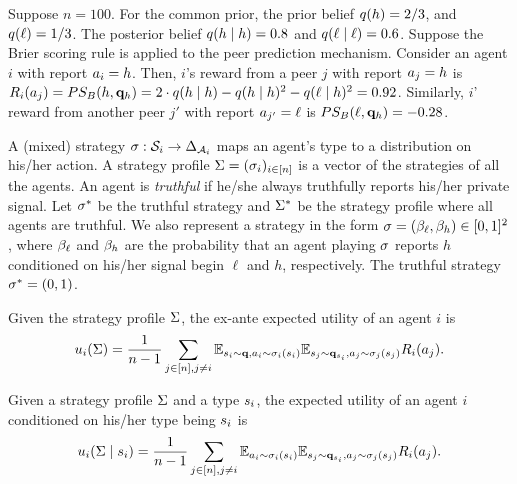 \begin{example}
    \label{ex:setting}
    Suppose $n = 100$. For the common prior, the prior belief $q(h) = 2/3$, and $q(\ell) = 1/3$. The posterior belief $q(h \mid h) = 0.8$ and $q(\ell \mid \ell) = 0.6$. Suppose the Brier scoring rule is applied to the peer prediction mechanism. Consider an agent $i$ with report $a_i = h$. Then, $i$'s reward from a peer $j$ with report $a_j = h$ is $R_i(a_j) = PS_B(h, \mathbf{q}_h) = 2\cdot q(h \mid h) - q(h\mid h)^2 - q(\ell \mid h)^2 = 0.92$. Similarly, $i$' reward from another peer $j'$ with report $a_{j'} = \ell$ is $PS_B(\ell, \mathbf{q}_h) = -0.28$. 
\end{example}

A (mixed) strategy $\sigma: \mathcal{S}_i \to \Delta_{\mathcal{A}_i}$ maps an agent's type to a distribution on his/her action. A strategy profile $\Sigma = (\sigma_i)_{i \in [n]}$ is a vector of the strategies of all the agents. An agent is {\em truthful} if he/she always truthfully reports his/her private signal. Let $\sigma^*$ be the truthful strategy and $\Sigma^*$ be the strategy profile where all agents are truthful. 
We also represent a strategy in the form $\sigma = (\beta_{\ell}, \beta_{h}) \in [0, 1]^2$, where $\beta_{\ell}$ and $\beta_{h}$ are the probability that an agent playing $\sigma$ reports $h$ conditioned on his/her signal begin $\ell$  and $h$, respectively. The truthful strategy $\sigma^* = (0, 1)$.

Given the strategy profile $\Sigma$, the ex-ante expected utility of an agent $i$ is
\begin{equation*}
    u_i(\Sigma) = \frac{1}{n-1}\sum_{j\in [n], j\neq i} \mathbb{E}_{s_i \sim \mathbf{q}
    , a_i \sim \sigma_i(s_i)} \mathbb{E}_{s_j \sim \mathbf{q}_{s_i}, a_j \sim \sigma_j(s_j)} R_i(a_j). 
\end{equation*}

Given a strategy profile $\Sigma$ and a type $s_i$, the \qi{} expected utility of an agent $i$ conditioned on his/her type being $s_i$ is 
\begin{equation*}
    u_i(\Sigma\mid s_i) = \frac{1}{n-1}\sum_{j\in [n], j\neq i} \mathbb{E}_{a_i \sim \sigma_i(s_i)} \mathbb{E}_{s_j \sim \mathbf{q}_{s_i}, a_j \sim \sigma_j(s_j)} R_i(a_j). 
\end{equation*}

